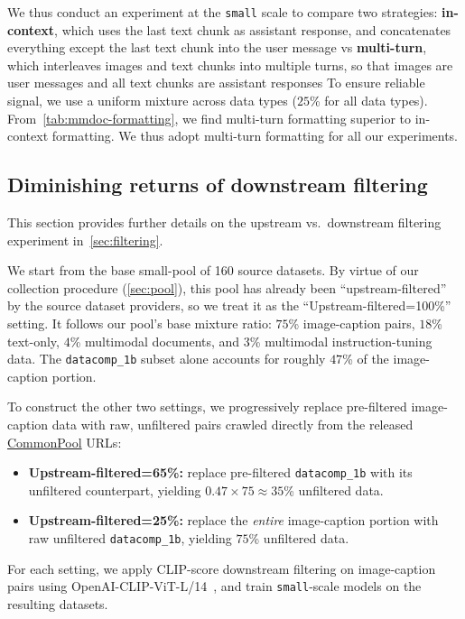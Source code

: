 We thus conduct an experiment at the \texttt{small} scale to compare two strategies:
\textbf{in-context}, which uses the last text chunk as assistant response, and concatenates everything %
except the last text chunk into the user message
vs \textbf{multi-turn}, which interleaves images and text chunks into multiple turns, so that images are user messages and all text chunks are assistant responses
To ensure reliable signal, we use a uniform mixture across data types ($25$\% for all data types). 
From~\cref{tab:mmdoc-formatting}, we find multi-turn formatting superior to in-context formatting.
We thus adopt multi-turn formatting for all our experiments. %

\subsection{Diminishing returns of downstream filtering}
\label{app:filtering-exp}
This section provides further details on the upstream vs.\ downstream filtering experiment in~\cref{sec:filtering}.

We start from the base \dcvlm{} small-pool of 160 source datasets. By virtue of our collection procedure (\cref{sec:pool}), this pool has already been ``upstream-filtered'' by the source dataset providers, so we treat it as the ``Upstream-filtered=100\%'' setting. It follows our pool's base mixture ratio: $75$\% image-caption pairs, $18$\% text-only, $4$\% multimodal documents, and $3$\% multimodal instruction-tuning data. The \texttt{datacomp\_1b} subset alone accounts for roughly $47$\% of the image-caption portion.

To construct the other two settings, we progressively replace pre-filtered image-caption data with raw, unfiltered pairs crawled directly from the released \href{https://huggingface.co/datasets/mlfoundations/datacomp_pools}{CommonPool} URLs:
\begin{itemize}
    \item \textbf{Upstream-filtered=65\%:} replace pre-filtered \texttt{datacomp\_1b} with its unfiltered counterpart, yielding $0.47 \times 75 \approx 35$\% unfiltered data.
    \item \textbf{Upstream-filtered=25\%:} replace the \emph{entire} image-caption portion with raw unfiltered \texttt{datacomp\_1b}, yielding $75$\% unfiltered data.
\end{itemize}

For each setting, we apply CLIP-score downstream filtering on image-caption pairs using OpenAI-CLIP-ViT-L/14~\citep{radford2021learning}, and train \texttt{small}-scale models on the resulting datasets.

